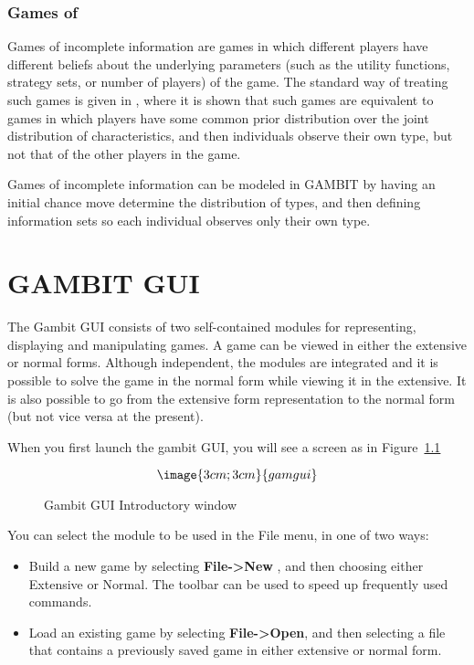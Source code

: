 \subsection{Games of }\label{incinfsec}
Games of incomplete information are games in which different players have 
different beliefs about the underlying parameters (such as the utility 
functions, strategy sets, or number of players) of the game.  The standard 
way of treating such games is given in \cite{Harsanyi:1967}, where it
is shown that 
 such games are equivalent to games in which players have some common
prior distribution over the joint distribution of characteristics, and
 then individuals observe their own type, but not that of the other players 
in the game.  

Games of incomplete information can be modeled in GAMBIT by having an
initial chance move determine the distribution of types, and then
defining information sets so each individual observes only their own
type.

\chapter{GAMBIT GUI}

The Gambit GUI consists of two self-contained modules for
representing, displaying and manipulating games.  A game can be viewed
in either the extensive or normal forms.  Although independent, the
modules are integrated and it is possible to solve the game
in the normal form while viewing it in the extensive.  It is also
possible to go from the extensive form representation to the normal
form (but not vice versa at the present).  

When you first launch the gambit GUI, you will see a screen as in
Figure~\ref{fig_gamgui}

\begin{figure}
$$\image{3cm;3cm}{gamgui}$$
\caption{Gambit GUI Introductory window}\label{fig_gamgui}
\end{figure}

You can select the module to be used in the File menu,
in one of two ways:

\begin{itemize}
\item Build a new game by selecting {\bf File->New} , and then
choosing either Extensive or Normal.  The toolbar can be used to speed
up frequently used commands.
\item Load an existing game by selecting {\bf File->Open}, and then
selecting a file that contains a previously saved game in either
extensive or normal form.
\end{itemize}

